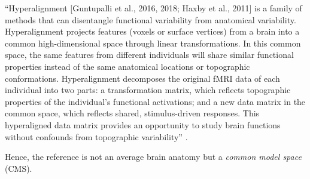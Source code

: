 %
``Hyperalignment [Guntupalli et al., 2016, 2018; Haxby et al., 2011] is a family
of methods that can disentangle functional variability from anatomical
variability. Hyperalignment projects features (voxels or surface vertices) from
a brain into a common high-dimensional space through linear transformations. In
this common space, the same features from different individuals will share
similar functional properties instead of the same anatomical locations or
topographic conformations. Hyperalignment decomposes the original fMRI data of
each individual into two parts: a transformation matrix, which reflects
topographic properties of the individual's functional activations; and a new
data matrix in the common space, which reflects shared, stimulus-driven
responses. This hyperaligned data matrix provides an opportunity to study brain
functions without confounds from topographic variability''
\citep{feilong2018reliable}.

Hence, the reference is not an average brain anatomy but a \textit{common model
space} (CMS).


